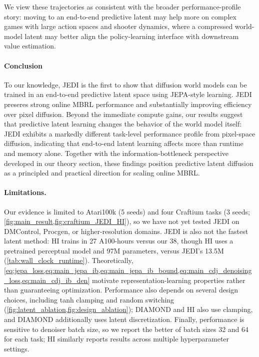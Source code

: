\documentclass{article}
\begin{document}
We view these trajectories as consistent with the broader performance-profile story: moving to an end-to-end predictive latent may help more on complex games with large action spaces and shooter dynamics, where a compressed world-model latent may better align the policy-learning interface with downstream value estimation.

\paragraph{Conclusion}
To our knowledge, JEDI is the first to show that diffusion world models can be trained in an end-to-end predictive latent space using JEPA-style learning. JEDI preseres strong online MBRL performance and substantially improving efficiency over pixel diffusion. Beyond the immediate compute gains, our results suggest that predictive latent learning changes the behavior of the world model itself: JEDI exhibits a markedly different task-level performance profile from pixel-space diffusion, indicating that end-to-end latent learning affects more than runtime and memory alone. Together with the information-bottleneck perspective developed in our theory section, these findings position predictive latent diffusion as a principled and practical direction for scaling online MBRL.

\paragraph{Limitations.}
\label{sec:limitations}
Our evidence is limited to Atari100k (5 seeds) and four Craftium tasks (3 seeds; \cref{fig:main_result,fig:craftium_JEDI_HI}), so we have not yet tested JEDI on DMControl, Procgen, or higher-resolution domains. JEDI is also not the fastest latent method: HI trains in 27 A100-hours versus our 38, though HI uses a pretrained perceptual model and 97M parameters, versus JEDI's 13.5M (\cref{tab:wall_clock_runtime}). Theoretically, \cref{eq:jepa_loss,eq:main_jepa_ib,eq:main_jepa_ib_bound,eq:main_cdj_denoising_loss,eq:main_cdj_ib_den} motivate representation-learning properties rather than guaranteeing optimization. Performance also depends on several design choices, including tanh clamping and random switching (\cref{fig:latent_ablation,fig:design_ablation}); DIAMOND and HI also use clamping, and DIAMOND additionally uses latent discretization. Finally, performance is sensitive to denoiser batch size, so we report the better of batch sizes 32 and 64 for each task; HI similarly reports results across multiple hyperparameter settings.
\end{document}
